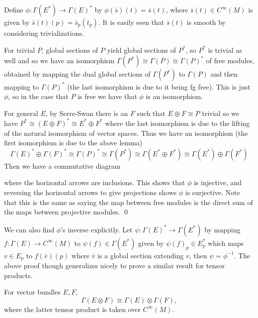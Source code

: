 \eprop

\bproof

    Define $\phi\colon\Gamma(E^*)\to\Gamma(E)^*$ by $\phi(\bar s)(t)=\bar s(t)$, where $\bar s(t)\in C^\infty(M)$ is given by $\bar s(t)(p)=\bar s_p(t_p)$.
    It is easily seen that $\bar s(t)$ is smooth by considering trivializations.

    For trivial $P$, global sections of $P$ yield global sections of $P^*$, so $P^*$ is trivial as well and so we have an isomorphism $\Gamma(P^*)\cong\Gamma(P)\cong\Gamma(P)^*$
    of free modules, obtained by mapping the dual global sections of $\Gamma(P^*)$ to $\Gamma(P)$ and then mapping to $\Gamma(P)^*$ (the last isomorphism is due to it being
    fg free).
    This is just $\phi$, so in the case that $P$ is free we have that $\phi$ is an isomorphism.

    For general $E$, by Serre-Swan there is an $F$ such that $E\oplus F\cong P$ trivial so we have $P^*\cong(E\oplus F)^*\cong E^*\oplus F^*$ where the last isomorphism is due to the
    lifting of the natural isomorphism of vector spaces.
    Thus we have an isomorphism (the first isomorphism is due to the above lemma)
    $$ \Gamma(E)^*\oplus\Gamma(F)^* \cong \Gamma(P)^* \cong \Gamma(P^*) \cong \Gamma(E^*\oplus F^*) \cong \Gamma(E^*)\oplus\Gamma(F^*) $$
    Then we have a commutative diagram

        {}{}{\phi}{\cong}

    where the horizontal arrows are inclusions.
    This shows that $\phi$ is injective, and reversing the horizontal arrows to give projections shows $\phi$ is surjective.
    Note that this is the same as saying the map between free modules is the direct sum of the maps between projective modules.
    \qed

\eproof

We can also find $\phi$'s inverse explicitly.
Let $\psi\colon\Gamma(E)^*\to\Gamma(E^*)$ by mapping $f\colon\Gamma(E)\to C^\infty(M)$ to $\psi(f)\in\Gamma(E^*)$ given by $\psi(f)_p\in E^*_p$
which maps $v\in E_p$ to $f(\bar v)(p)$ where $\bar v$ is a global section extending $v$, then $\psi=\phi^{-1}$.
The above proof though generalizes nicely to prove a similar result for tensor products.

\bprop

    For vector bundles $E,F$,
    $$ \Gamma(E\otimes F)\cong\Gamma(E)\otimes\Gamma(F), $$
    where the latter tensor product is taken over $C^\infty(M)$.

